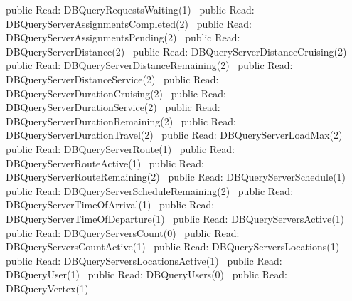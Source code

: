 public \LA{}Read: DBQueryRequestsWaiting(1)~{\nwtagstyle{}}\RA{}
public \LA{}Read: DBQueryServerAssignmentsCompleted(2)~{\nwtagstyle{}}\RA{}
public \LA{}Read: DBQueryServerAssignmentsPending(2)~{\nwtagstyle{}}\RA{}
public \LA{}Read: DBQueryServerDistance(2)~{\nwtagstyle{}}\RA{}
public \LA{}Read: DBQueryServerDistanceCruising(2)~{\nwtagstyle{}}\RA{}
public \LA{}Read: DBQueryServerDistanceRemaining(2)~{\nwtagstyle{}}\RA{}
public \LA{}Read: DBQueryServerDistanceService(2)~{\nwtagstyle{}}\RA{}
public \LA{}Read: DBQueryServerDurationCruising(2)~{\nwtagstyle{}}\RA{}
public \LA{}Read: DBQueryServerDurationService(2)~{\nwtagstyle{}}\RA{}
public \LA{}Read: DBQueryServerDurationRemaining(2)~{\nwtagstyle{}}\RA{}
public \LA{}Read: DBQueryServerDurationTravel(2)~{\nwtagstyle{}}\RA{}
public \LA{}Read: DBQueryServerLoadMax(2)~{\nwtagstyle{}}\RA{}
public \LA{}Read: DBQueryServerRoute(1)~{\nwtagstyle{}}\RA{}
public \LA{}Read: DBQueryServerRouteActive(1)~{\nwtagstyle{}}\RA{}
public \LA{}Read: DBQueryServerRouteRemaining(2)~{\nwtagstyle{}}\RA{}
public \LA{}Read: DBQueryServerSchedule(1)~{\nwtagstyle{}}\RA{}
public \LA{}Read: DBQueryServerScheduleRemaining(2)~{\nwtagstyle{}}\RA{}
public \LA{}Read: DBQueryServerTimeOfArrival(1)~{\nwtagstyle{}}\RA{}
public \LA{}Read: DBQueryServerTimeOfDeparture(1)~{\nwtagstyle{}}\RA{}
public \LA{}Read: DBQueryServersActive(1)~{\nwtagstyle{}}\RA{}
public \LA{}Read: DBQueryServersCount(0)~{\nwtagstyle{}}\RA{}
public \LA{}Read: DBQueryServersCountActive(1)~{\nwtagstyle{}}\RA{}
public \LA{}Read: DBQueryServersLocations(1)~{\nwtagstyle{}}\RA{}
public \LA{}Read: DBQueryServersLocationsActive(1)~{\nwtagstyle{}}\RA{}
public \LA{}Read: DBQueryUser(1)~{\nwtagstyle{}}\RA{}
public \LA{}Read: DBQueryUsers(0)~{\nwtagstyle{}}\RA{}
public \LA{}Read: DBQueryVertex(1)~{\nwtagstyle{}}\RA{}
